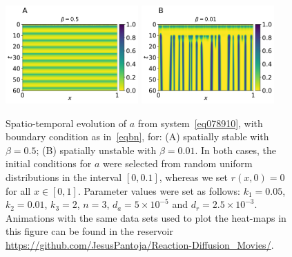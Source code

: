 \documentclass[%
 preprint,
 amsmath,amssymb,
 aps,
]{revtex4-2}
\begin{document}
	\begin{figure}[t!]
		\centering
		\includegraphics[width=2in]{Figures/Fig03aRev.pdf}
		\includegraphics[width=2in]{Figures/Fig03bRev.pdf}
		\caption{Spatio-temporal evolution of $a$ from system~\eqref{eq078910}, with
			boundary condition as in~\eqref{eqbn}, for: (A) spatially stable with
			$\beta=0.5$; (B) spatially unstable with $\beta=0.01$. In both cases, the
			initial conditions for $a$ were selected from random uniform distributions in
			the interval $[0, 0.1]$, whereas we set $r(x, 0) = 0$ for all $x\in[0,1]$.
			Parameter values were set as follows: $k_1=0.05$, $k_2=0.01$, $k_3=2$, $n=3$, $d_a =
			5\times10^{-5}$ and $d_r=2.5\times10^{-3}$. Animations with the same 
			data sets used to plot the heat-maps in this figure can be found in the 
			reservoir \url{https://github.com/JesusPantoja/Reaction-Diffusion_Movies/}.}
		\label{Fig03}
	\end{figure}
	
\end{document}
